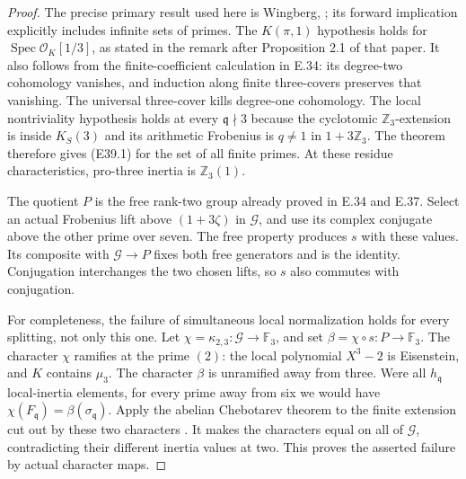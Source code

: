 \begin{proof}
The precise primary result used here is Wingberg,
\cite[Theorem 2.4, pp.~13--14]{E_WingbergRiemann}; its
forward implication explicitly includes infinite sets of
primes. The $K(\pi,1)$ hypothesis holds for
$\operatorname{Spec}\mathcal O_K[1/3]$, as stated in the
remark after Proposition 2.1 of that paper. It also follows
from the finite-coefficient calculation in E.34: its
degree-two cohomology vanishes, and induction along finite
three-covers preserves that vanishing. The universal
three-cover kills degree-one cohomology. The local
nontriviality hypothesis holds at every $\mathfrak q\nmid3$
because the cyclotomic $\mathbb Z_3$-extension is inside
$K_S(3)$ and its arithmetic Frobenius is $q\ne1$ in
$1+3\mathbb Z_3$. The theorem therefore gives (E39.1)
for the set of all finite primes. At these residue
characteristics, pro-three inertia is $\mathbb Z_3(1)$.

The quotient $P$ is the free rank-two group already
proved in E.34 and E.37. Select an actual Frobenius lift
above $(1+3\zeta)$ in $\mathcal G$, and use its complex
conjugate above the other prime over seven. The free
property produces $s$ with these values. Its composite
with $\mathcal G\to P$ fixes both free generators and
is the identity. Conjugation interchanges the two chosen
lifts, so $s$ also commutes with conjugation.

For completeness, the failure of simultaneous local
normalization holds for every splitting, not only this
one. Let $\chi=\kappa_{2,3}:\mathcal G\to\mathbb F_3$,
and set $\beta=\chi\circ s:P\to\mathbb F_3$.
The character $\chi$ ramifies at the prime $(2)$:
the local polynomial $X^3-2$ is Eisenstein, and $K$
contains $\mu_3$. The character $\beta$ is unramified
away from three. Were all $h_{\mathfrak q}$ local-inertia
elements, for every prime away from six we would have
$\chi(F_{\mathfrak q})=\beta(\sigma_{\mathfrak q})$.
Apply the abelian Chebotarev theorem to the finite
extension cut out by these two characters
\cite[V, Theorem 3.23]{E_MilneCFT}.
It makes the characters equal on all of $\mathcal G$,
contradicting their different inertia values at two.
This proves the asserted failure by actual character maps.


\end{proof}
